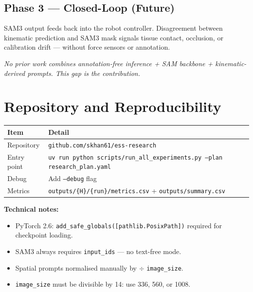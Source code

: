 \documentclass[11pt, a4paper]{article}
\begin{document}
\subsection{Phase 3 --- Closed-Loop (Future)}
SAM3 output feeds back into the robot controller. Disagreement between kinematic
prediction and SAM3 mask signals tissue contact, occlusion, or calibration drift ---
without force sensors or annotation.

\medskip
\noindent\textit{No prior work combines annotation-free inference + SAM backbone +
kinematic-derived prompts. This gap is the contribution.}

\section{Repository and Reproducibility}

\begin{center}
\begin{tabular}{ll}
\toprule
\textbf{Item} & \textbf{Detail} \\
\midrule
Repository  & \texttt{github.com/skhan61/ess-research} \\
Entry point & \texttt{uv run python scripts/run\_all\_experiments.py --plan research\_plan.yaml} \\
Debug       & Add \texttt{--debug} flag \\
Metrics     & \texttt{outputs/\{H\}/\{run\}/metrics.csv} + \texttt{outputs/summary.csv} \\
\bottomrule
\end{tabular}
\end{center}

\textbf{Technical notes:}
\begin{itemize}[noitemsep]
    \item PyTorch 2.6: \texttt{add\_safe\_globals([pathlib.PosixPath])} required for
          checkpoint loading.
    \item SAM3 always requires \texttt{input\_ids} --- no text-free mode.
    \item Spatial prompts normalised manually by $\div$ \texttt{image\_size}.
    \item \texttt{image\_size} must be divisible by 14: use 336, 560, or 1008.
\end{itemize}

\nocite{qin2020uw,hfrfnet2025,ravi2024sam2,rocha2019kinematic,sestini2025safis,yue2024surgicalsam,wu2024pointtracking,liu2024surgsam2}


\end{document}
